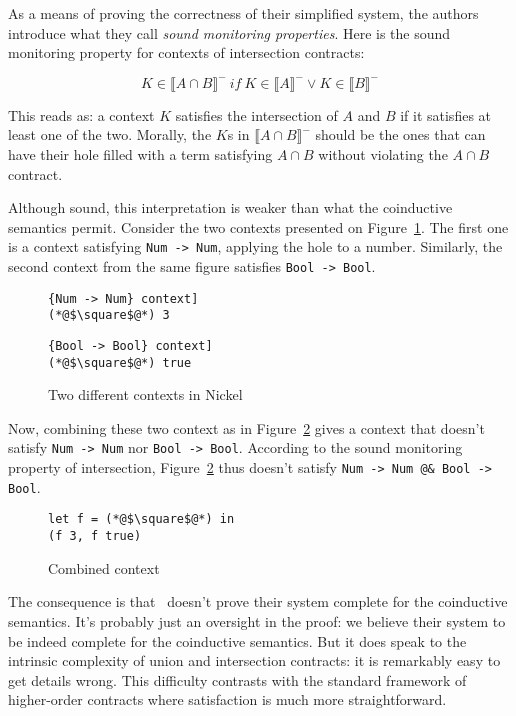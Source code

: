 \documentclass[sigplan,10pt,review,anonymous]{acmart}
\newcommand{\nickel}[1]{\lstinline[language=nickel]{#1}}
\begin{document}
As a means of proving the correctness of their simplified system, the
authors introduce what they call \emph{sound monitoring
  properties}. Here is the sound monitoring property for contexts of
intersection contracts:

$$ K \in \llbracket A \cap B \rrbracket^-~if~K \in \llbracket A \rrbracket^- \lor K \in \llbracket B \rrbracket^- $$

This reads as: a context $K$ satisfies the intersection of $A$ and $B$ if it
satisfies at least one of the two. Morally, the $K$s in $\llbracket A \cap B
\rrbracket^-$  should be the ones that can have their hole filled with a term
satisfying $A \cap B$ without violating the $A \cap B$ contract.

Although sound, this interpretation is weaker than what the
coinductive semantics permit. Consider the two contexts presented on
Figure~\ref{fig:valid-contexts}. The first one is a context satisfying
\nickel{Num -> Num}, applying the hole to a number. Similarly, the second context
from the same figure satisfies \nickel{Bool -> Bool}.

\begin{figure}[h]
\begin{lstlisting}[language=nickel, title=\nickel{Num -> Num} context]
(*@$\square$@*) 3
\end{lstlisting}
\begin{lstlisting}[language=nickel, title=\nickel{Bool -> Bool} context]
(*@$\square$@*) true
\end{lstlisting}
\caption{Two different contexts in Nickel}
\label{fig:valid-contexts}
\end{figure}

Now, combining these two context as in Figure~\ref{fig:invalid-context} gives a context
that doesn't satisfy \nickel{Num -> Num} nor \hbox{\nickel{Bool -> Bool}.}  According
to the sound monitoring property of intersection, Figure~\ref{fig:invalid-context} thus doesn't satisfy \nickel{Num
-> Num @& Bool -> Bool}.

\begin{figure}[h]
\begin{lstlisting}[language=nickel]
let f = (*@$\square$@*) in
(f 3, f true)
\end{lstlisting}
\caption{Combined context}
\label{fig:invalid-context}
\end{figure}

The consequence is that~\cite{RootCauseOfBlame} doesn't prove their
system complete for the coinductive semantics. It's probably just an
oversight in the proof: we believe their system to be indeed complete
for the coinductive semantics. But it does speak to the intrinsic
complexity of union and intersection contracts: it is remarkably easy
to get details wrong. This difficulty contrasts with the standard
framework of higher-order contracts where satisfaction is much more
straightforward.
\end{document}
